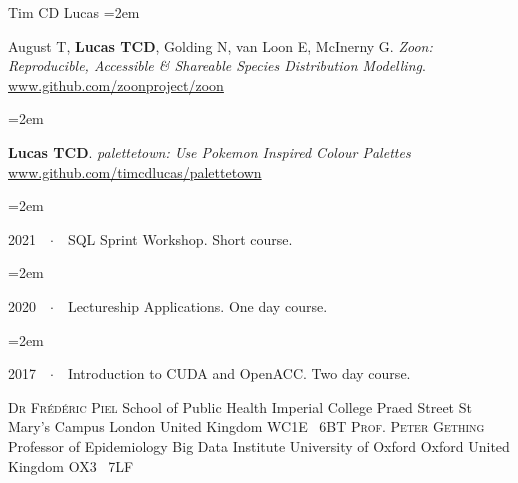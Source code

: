 \documentclass{scrartcl}
\newcommand{\Description}[1]{\hangindent=2em\hangafter=0\noindent\raggedright\footnotesize{#1}\par\normalsize\vspace{1em}} %
\begin{document}
\begin{cv}{Tim {\Large CD} Lucas}
\Description{August T, \textbf{Lucas TCD}, Golding N, van Loon E, McInerny G. \emph{Zoon: Reproducible, Accessible \& Shareable Species Distribution Modelling}. \url{www.github.com/zoonproject/zoon}}

\Description{\textbf{Lucas TCD}. \emph{palettetown: Use Pokemon Inspired Colour Palettes} \url{www.github.com/timcdlucas/palettetown}}





\vspace{1em} %


{\color{Maroon}}\vspace{1em}

\Description{2021\ \ $\cdotp$\ \ SQL Sprint Workshop. Short course.}
\vspace{-0.5em} %
\Description{2020\ \ $\cdotp$\ \ Lectureship Applications. One day course.}
\vspace{-0.5em} %
\Description{2017\ \ $\cdotp$\ \ Introduction to CUDA and OpenACC. Two day course.}
\vspace{-0.5em} %

\vspace{1em} %


{\color{Maroon}}\vspace{-1em}

\begin{multicols}{2}
\begin{footnotesize}
\textsc{Dr Fr\'{e}d\'{e}ric Piel}\newline
School of Public Health\newline
Imperial College\newline
Praed Street\newline
St Mary's Campus 
London\newline
United Kingdom\newline
{\scriptsize WC}1{\scriptsize E} \ 6{\scriptsize BT}
\vfill
\columnbreak
\textsc{Prof. Peter Gething}\newline
Professor of Epidemiology\newline
Big Data Institute\newline
University of Oxford\newline
Oxford\newline
United Kingdom\newline
{\scriptsize OX}3 \ 7{\scriptsize LF}



\end{footnotesize}
\end{multicols}
\end{cv}
\end{document}
